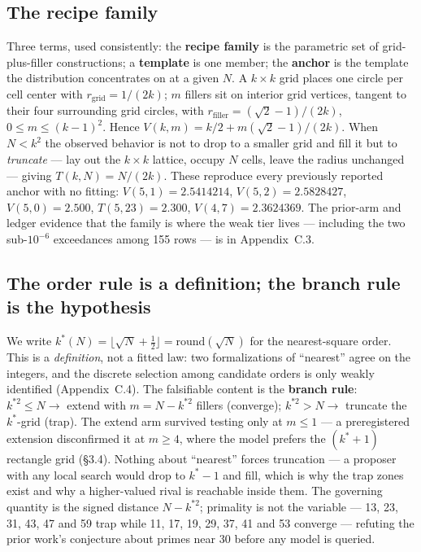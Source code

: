 \subsection{The recipe family}

Three terms, used consistently: the \textbf{recipe family} is the parametric set of grid-plus-filler
constructions; a \textbf{template} is one member; the \textbf{anchor} is the template the
distribution concentrates on at a given $N$. A $k \times k$ grid places one circle per cell center
with $r_{\mathrm{grid}} = 1/(2k)$; $m$ fillers sit on interior grid vertices, tangent to their four
surrounding grid circles, with $r_{\mathrm{filler}} = (\sqrt{2} - 1)/(2k)$, $0 \le m \le (k-1)^2$.
Hence $V(k, m) = k/2 + m(\sqrt{2} - 1)/(2k)$. When $N < k^2$ the observed behavior is not to drop to
a smaller grid and fill it but to \emph{truncate} --- lay out the $k \times k$ lattice, occupy $N$
cells, leave the radius unchanged --- giving $T(k, N) = N/(2k)$. These reproduce every previously
reported anchor with no fitting: $V(5,1) = 2.5414214$, $V(5,2) = 2.5828427$, $V(5,0) = 2.500$,
$T(5,23) = 2.300$, $V(4,7) = 2.3624369$. The prior-arm and ledger evidence that the family is where
the weak tier lives --- including the two sub-$10^{-6}$ exceedances among 155 rows --- is in
Appendix~C.3.

\subsection{The order rule is a definition; the branch rule is the hypothesis}

We write $k^*(N) = \lfloor \sqrt{N} + \tfrac{1}{2} \rfloor = \mathrm{round}(\sqrt{N})$ for the
nearest-square order. This is a \emph{definition}, not a fitted law: two formalizations of
``nearest'' agree on the integers, and the discrete selection among candidate orders is only weakly
identified (Appendix~C.4). The falsifiable content is the \textbf{branch rule}:
$k^{*2} \le N \rightarrow$ extend with $m = N - k^{*2}$ fillers (converge);
$k^{*2} > N \rightarrow$ truncate the $k^*$-grid (trap). The extend arm survived testing only at
$m \le 1$ --- a preregistered extension disconfirmed it at $m \ge 4$, where the model prefers the
$(k^*{+}1)$ rectangle grid (\S3.4). Nothing about ``nearest'' forces truncation --- a proposer with
any local search would drop to $k^*{-}1$ and fill, which is why the trap zones exist and why a
higher-valued rival is reachable inside them. The governing quantity is the signed distance
$N - k^{*2}$; primality is not the variable --- 13, 23, 31, 43, 47 and 59 trap while 11, 17, 19,
29, 37, 41 and 53 converge --- refuting the prior work's conjecture about primes near 30 before any
model is queried.

